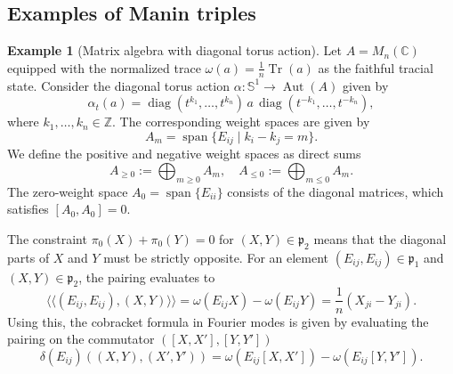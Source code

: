 \documentclass[11pt,reqno]{amsart}
\theoremstyle{definition}
\newtheorem{example}[theorem]{Example}
\numberwithin{equation}{section}
\begin{document}
\subsection{Examples of Manin triples}
\begin{example}[Matrix algebra with diagonal torus action]
Let $A = M_n(\mathbb{C})$ equipped with the normalized trace $\omega(a) = \frac{1}{n}\operatorname{Tr}(a)$ as the faithful tracial state. Consider the diagonal torus action $\alpha: \mathbb{S}^1 \rightarrow \operatorname{Aut}(A)$ given by
\[
\alpha_t(a) = \operatorname{diag}(t^{k_1}, \dots, t^{k_n}) \, a \, \operatorname{diag}(t^{-k_1}, \dots, t^{-k_n}),
\]
where $k_1, \dots, k_n \in \mathbb{Z}$. The corresponding weight spaces are given by
\[
A_m = \operatorname{span}\{E_{ij} \mid k_i - k_j = m\}.
\]
We define the positive and negative weight spaces as direct sums
\[
A_{\ge 0} := \bigoplus_{m \ge 0} A_m, \quad A_{\le 0} := \bigoplus_{m \le 0} A_m.
\]
The zero-weight space $A_0 = \operatorname{span}\{E_{ii}\}$ consists of the diagonal matrices, which satisfies $[A_0, A_0] = 0$. 

The constraint $\pi_0(X) + \pi_0(Y) = 0$ for $(X, Y) \in \mathfrak{p}_2$ means that the diagonal parts of $X$ and $Y$ must be strictly opposite. For an element $(E_{ij}, E_{ij}) \in \mathfrak{p}_1$ and $(X, Y) \in \mathfrak{p}_2$, the pairing evaluates to
\[
\langle\langle (E_{ij}, E_{ij}), (X, Y) \rangle\rangle = \omega(E_{ij}X) - \omega(E_{ij}Y) = \frac{1}{n}(X_{ji} - Y_{ji}).
\]
Using this, the cobracket formula in Fourier modes is given by evaluating the pairing on the commutator $([X, X'], [Y, Y'])$
\[
\delta(E_{ij})((X, Y), (X', Y')) = \omega(E_{ij}[X, X']) - \omega(E_{ij}[Y, Y']).
\]
\end{example}
\end{document}
